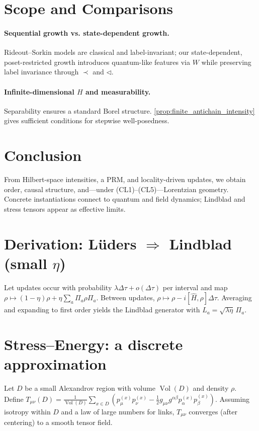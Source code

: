 \documentclass[12pt,a4paper]{article}
\DeclareMathOperator{\Vol}{Vol}
\begin{document}
\section{Scope and Comparisons}



\paragraph{Sequential growth vs. state-dependent growth.}
Rideout--Sorkin models are classical and label-invariant; our state-dependent, poset-restricted growth introduces quantum-like features via $W$ while preserving label invariance through $\prec$ and $\triangleleft$.

\paragraph{Infinite-dimensional $H$ and measurability.}
Separability ensures a standard Borel structure. \cref{prop:finite_antichain_intensity} gives sufficient conditions for stepwise well-posedness.

\section{Conclusion}

From Hilbert-space intensities, a PRM, and locality-driven updates, we obtain order, causal structure, and---under (CL1)--(CL5)---Lorentzian geometry. Concrete instantiations connect to quantum and field dynamics; Lindblad and stress tensors appear as effective limits.



\appendix

\section{Derivation: L\"{u}ders $\Rightarrow$ Lindblad (small $\eta$)}
Let updates occur with probability $\lambda\Delta\tau + o(\Delta\tau)$ per interval and map $\rho\mapsto (1-\eta)\rho + \eta\sum_a \Pi_a\rho\Pi_a$. Between updates, $\rho\mapsto \rho-i[\hat H,\rho]\Delta\tau$. Averaging and expanding to first order yields the Lindblad generator with $L_a=\sqrt{\lambda\eta}\,\Pi_a$.

\section{Stress--Energy: a discrete approximation}
Let $D$ be a small Alexandrov region with volume $\Vol(D)$ and density $\rho$. Define
$T_{\mu\nu}(D)=\frac{1}{\Vol(D)}\sum_{x\in D}\!\left(p_\mu^{(x)}p_\nu^{(x)} - \tfrac12 g_{\mu\nu} g^{\alpha\beta}p_\alpha^{(x)}p_\beta^{(x)}\right)$.
Assuming isotropy within $D$ and a law of large numbers for links, $T_{\mu\nu}$ converges (after centering) to a smooth tensor field.
\end{document}
